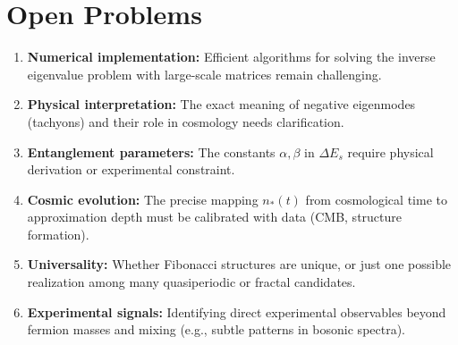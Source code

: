 \section{Open Problems}
\begin{enumerate}
    \item \textbf{Numerical implementation:} Efficient algorithms for solving the inverse eigenvalue problem with large-scale matrices remain challenging.  
    \item \textbf{Physical interpretation:} The exact meaning of negative eigenmodes (tachyons) and their role in cosmology needs clarification.  
    \item \textbf{Entanglement parameters:} The constants $\alpha, \beta$ in $\Delta E_s$ require physical derivation or experimental constraint.  
    \item \textbf{Cosmic evolution:} The precise mapping $n_*(t)$ from cosmological time to approximation depth must be calibrated with data (CMB, structure formation).  
    \item \textbf{Universality:} Whether Fibonacci structures are unique, or just one possible realization among many quasiperiodic or fractal candidates.  
    \item \textbf{Experimental signals:} Identifying direct experimental observables beyond fermion masses and mixing (e.g., subtle patterns in bosonic spectra).  
\end{enumerate}
